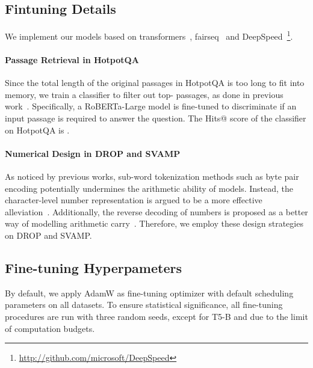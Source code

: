 \subsection{Fintuning Details}

We implement our models based on transformers~\cite{wolf-etal-2020-transformers}, fairseq~\cite{ott-etal-2019-fairseq} and DeepSpeed~\footnote{\url{http://github.com/microsoft/DeepSpeed}}.

\paragraph{Passage Retrieval in HotpotQA} Since the total length of the original passages in HotpotQA is too long to fit into memory, we train a classifier to filter out top- passages, as done in previous work~\citep{deng2021reasonbert}.
Specifically, a RoBERTa-Large model is fine-tuned to discriminate if an input passage is required to answer the question. 
The Hits@ score of the classifier on HotpotQA is .

\paragraph{Numerical Design in DROP and SVAMP}

As noticed by previous works, sub-word tokenization methods such as byte pair encoding \cite{DBLP:journals/corr/SennrichHB15} potentially undermines the arithmetic ability of models.
Instead, the character-level number representation is argued to be a more effective alleviation~\cite{wallace-etal-2019-nlp}.
Additionally, the reverse decoding of numbers is proposed as a better way of modelling arithmetic carry~\citep{geva-etal-2020-injecting}. 
Therefore, we employ these design strategies on DROP and SVAMP. 



\subsection{Fine-tuning Hyperpameters}

By default, we apply AdamW as fine-tuning optimizer with default scheduling parameters on all datasets. To ensure statistical significance, all fine-tuning procedures are run with three random seeds, except for T5-B and \ourstfive due to the limit of computation budgets.

